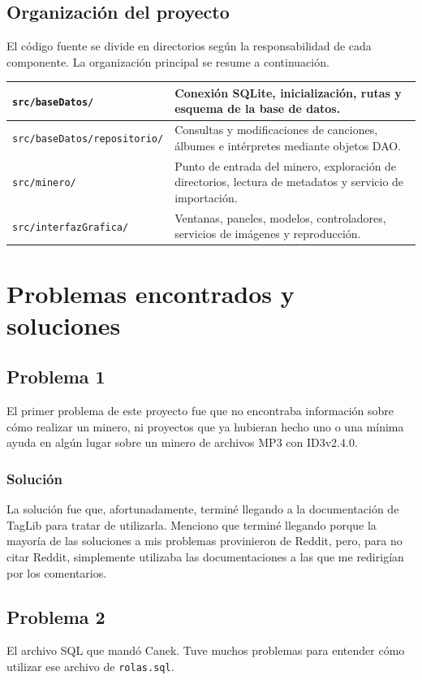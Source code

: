 \documentclass[10pt,a4paper]{article}
\begin{document}
\subsection{Organización del proyecto}
El código fuente se divide en directorios según la responsabilidad de cada componente. La organización principal se resume a continuación.

\begin{table}[H]
    \centering
    \begin{tabular}{|p{5.1cm}|p{8.9cm}|}
        \hline
        \texttt{src/baseDatos/} & Conexión SQLite, inicialización, rutas y esquema de la base de datos. \\ \hline
        \texttt{src/baseDatos/repositorio/} & Consultas y modificaciones de canciones, álbumes e intérpretes mediante objetos DAO. \\ \hline
        \texttt{src/minero/} & Punto de entrada del minero, exploración de directorios, lectura de metadatos y servicio de importación. \\ \hline
        \texttt{src/interfazGrafica/} & Ventanas, paneles, modelos, controladores, servicios de imágenes y reproducción. \\ \hline
    \end{tabular}
\end{table}

\section{Problemas encontrados y soluciones}

\subsection{Problema 1}
El primer problema de este proyecto fue que no encontraba información sobre cómo realizar un minero, ni proyectos que ya hubieran hecho uno o una mínima ayuda en algún lugar sobre un minero de archivos MP3 con ID3v2.4.0.
\subsubsection{Solución}
La solución fue que, afortunadamente, terminé llegando a la documentación de TagLib para tratar de utilizarla. Menciono que terminé llegando porque la mayoría de las soluciones a mis problemas provinieron de Reddit, pero, para no citar Reddit, simplemente utilizaba las documentaciones a las que me redirigían por los comentarios.

\subsection{Problema 2}
El archivo SQL que mandó Canek. Tuve muchos problemas para entender cómo utilizar ese archivo de \texttt{rolas.sql}.
\end{document}
